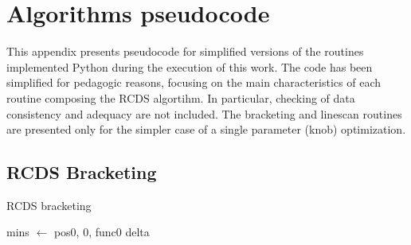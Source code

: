 \chapter{Algorithms pseudocode}
This appendix presents pseudocode for simplified versions of the routines implemented Python during the execution of this work. The code has been simplified for pedagogic reasons, focusing on the main characteristics of each routine composing the RCDS algortihm. In particular, checking of data consistency and adequacy are not included. The bracketing and linescan routines are presented only for the simpler case of a single parameter (knob) optimization.
\section{RCDS Bracketing}
\begin{algorithm}
    \caption{RCDS bracketing}\label{alg:brackets}
    \begin{algorithmic}
        \State mins $\gets$ pos0, 0, func0
        \State delta
    \EndFunction
    \end{algorithmic}
    \end{algorithm}

